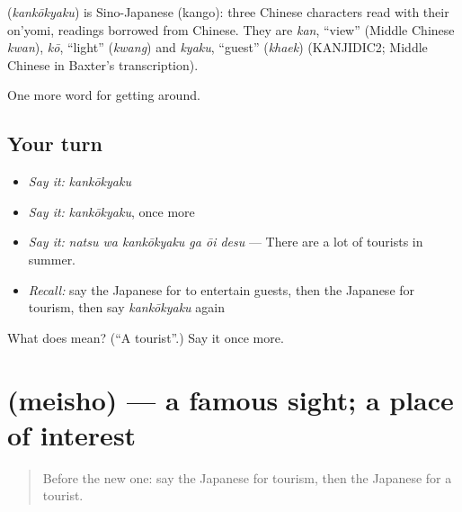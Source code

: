 \begin{cousinweb}
\textbf{} (\emph{kankōkyaku}) is Sino-Japanese (kango): three Chinese characters read with their on'yomi, readings borrowed from Chinese. They are \emph{kan}, \textquotedblleft{}view\textquotedblright{} (Middle Chinese \emph{kwan}), \emph{kō}, \textquotedblleft{}light\textquotedblright{} (\emph{kwang}) and \emph{kyaku}, \textquotedblleft{}guest\textquotedblright{} (\emph{khaek}) (KANJIDIC2; Middle Chinese in Baxter's transcription).
\end{cousinweb}

\begin{grammarlens}[title={What you've built}]
One more word for getting around.
\end{grammarlens}

\subsection*{Your turn}
\begin{itemize}
\raggedright
  \item \emph{Say it:} \emph{kankōkyaku}
  \item \emph{Say it:} \emph{kankōkyaku}, once more
  \item \emph{Say it:} \emph{natsu wa kankōkyaku ga ōi desu} — There are a lot of tourists in summer.
  \item \emph{Recall:} say the Japanese for to entertain guests, then the Japanese for tourism, then say \emph{kankōkyaku} again
\end{itemize}

\begin{tcolorbox}[breakable,colback=teal!4,colframe=teal!35!black,title={Before you move on}]
What does  mean? (\textquotedblleft{}A tourist\textquotedblright{}.) Say it once more.
\end{tcolorbox}
\section[\texorpdfstring{\ja{めいしょ} (meisho)}{めいしょ (meisho)}]{ (meisho) — a famous sight; a place of interest}

\label{lesson:JA-C402-meisho}



\begin{quote}
Before the new one: say the Japanese for tourism, then the Japanese for a tourist.
\end{quote}


